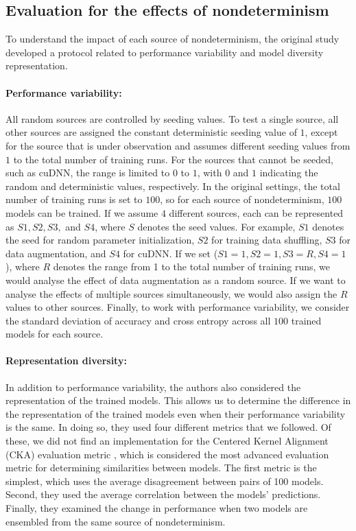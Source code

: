 \subsection{Evaluation for the effects of nondeterminism}
To understand the impact of each source of nondeterminism, the original study developed a protocol related to performance variability and model diversity representation. 
\paragraph{Performance variability:}
All random sources are controlled by seeding values. To test a single source, all other sources are assigned the constant deterministic seeding value of $1$, except for the source that is under observation and assumes different seeding values from $1$ to the total number of training runs. For the sources that cannot be seeded, such as cuDNN, the range is limited to $0$ to $1$, with $0$ and $1$ indicating the random and deterministic values, respectively. In the original settings, the total number of training runs is set to $100$, so for each source of nondeterminism, $100$ models can be trained. If we assume $4$ different sources, each can be represented as $S1, S2, S3,$ and $S4$, where $S$ denotes the seed values. For example, $S1$ denotes the seed for random parameter initialization, $S2$ for training data shuffling, $S3$ for data augmentation, and $S4$ for cuDNN. If we set ($S1=1, S2=1, S3=R, S4=1$), where $R$ denotes the range from 1 to the total number of training runs, we would analyse the effect of data augmentation as a random source. If we want to analyse the effects of multiple sources simultaneously, we would also assign the $R$ values to other sources. Finally, to work with performance variability, we consider the standard deviation of accuracy and cross entropy across all $100$ trained models for each source.
\paragraph{Representation diversity:}
In addition to performance variability, the authors also considered the representation of the trained models. This allows us to determine the difference in the representation of the trained models even when their performance variability is the same. In doing so, they used four different metrics that we followed. Of these, we did not find an implementation for the Centered Kernel Alignment (CKA) evaluation metric \cite{kornblith:2019}, which is considered the most advanced evaluation metric for determining similarities between models. The first metric is the simplest, which uses the average disagreement between pairs of 100 models. Second, they used the average correlation between the models' predictions. Finally, they examined the change in performance when two models are ensembled from the same source of nondeterminism.

